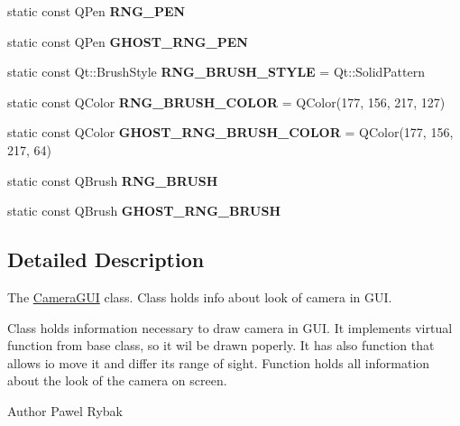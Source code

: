 \begin{DoxyCompactItemize}
\item 
\hypertarget{classCameraGUI_a2ad79374ad1db2e7fe7364b262825851}{static const Q\-Pen {\bfseries R\-N\-G\-\_\-\-P\-E\-N}}\label{classCameraGUI_a2ad79374ad1db2e7fe7364b262825851}

\item 
\hypertarget{classCameraGUI_a67439a62df649c6f76b0663dc3d14c09}{static const Q\-Pen {\bfseries G\-H\-O\-S\-T\-\_\-\-R\-N\-G\-\_\-\-P\-E\-N}}\label{classCameraGUI_a67439a62df649c6f76b0663dc3d14c09}

\item 
\hypertarget{classCameraGUI_a01530501f6b9e651ac94000aeb94ea1f}{static const Qt\-::\-Brush\-Style {\bfseries R\-N\-G\-\_\-\-B\-R\-U\-S\-H\-\_\-\-S\-T\-Y\-L\-E} = Qt\-::\-Solid\-Pattern}\label{classCameraGUI_a01530501f6b9e651ac94000aeb94ea1f}

\item 
\hypertarget{classCameraGUI_acc2e2bc371644b94c99d1c9d35688048}{static const Q\-Color {\bfseries R\-N\-G\-\_\-\-B\-R\-U\-S\-H\-\_\-\-C\-O\-L\-O\-R} = Q\-Color(177, 156, 217, 127)}\label{classCameraGUI_acc2e2bc371644b94c99d1c9d35688048}

\item 
\hypertarget{classCameraGUI_a8689b5f981805945dd4c1c251e7065e5}{static const Q\-Color {\bfseries G\-H\-O\-S\-T\-\_\-\-R\-N\-G\-\_\-\-B\-R\-U\-S\-H\-\_\-\-C\-O\-L\-O\-R} = Q\-Color(177, 156, 217, 64)}\label{classCameraGUI_a8689b5f981805945dd4c1c251e7065e5}

\item 
\hypertarget{classCameraGUI_a1f46ce78c9696e44e1330f591df3f5c4}{static const Q\-Brush {\bfseries R\-N\-G\-\_\-\-B\-R\-U\-S\-H}}\label{classCameraGUI_a1f46ce78c9696e44e1330f591df3f5c4}

\item 
\hypertarget{classCameraGUI_a3fd5e88f6a785f92bec36a9bb783eee9}{static const Q\-Brush {\bfseries G\-H\-O\-S\-T\-\_\-\-R\-N\-G\-\_\-\-B\-R\-U\-S\-H}}\label{classCameraGUI_a3fd5e88f6a785f92bec36a9bb783eee9}

\end{DoxyCompactItemize}


\subsection{Detailed Description}
The \hyperlink{classCameraGUI}{Camera\-G\-U\-I} class. Class holds info about look of camera in G\-U\-I. 

Class holds information necessary to draw camera in G\-U\-I. It implements virtual function from base class, so it wil be drawn poperly. It has also function that allows io move it and differ its range of sight. Function holds all information about the look of the camera on screen. \begin{DoxyAuthor}{Author}
Pawel Rybak 
\end{DoxyAuthor}


